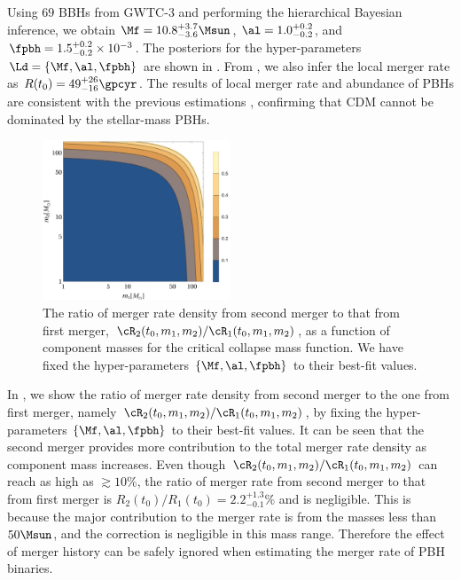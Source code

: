 \documentclass[
reprint,           %
superscriptaddress,%
amsmath,           %
amssymb,           %
aps,               %
prd,               %
notitlepage,       %
longbibliography,  %
floatfix,          %
nofootinbib,
]{revtex4-1}
\begin{document}
Using $69$ BBHs from GWTC-3 and performing the hierarchical Bayesian inference, we obtain $\Mf = 10.8^{+3.7}_{-3.6} \Msun$, $\al = 1.0^{+0.2}_{-0.2}$, and $\fpbh = 1.5^{+0.2}_{-0.2} \times 10^{-3}$. The posteriors for the hyper-parameters $\Ld = \{\Mf, \al, \fpbh\}$ are shown in . From , we also infer the local merger rate as $R(t_0) = 49^{+26}_{-16} \gpcyr$. The results of local merger rate and abundance of PBHs are consistent with the previous estimations \cite{Sasaki:2016jop,Ali-Haimoud:2017rtz,Chen:2018czv,Chen:2018rzo,Chen:2019irf,Wu:2020drm,Chen:2021nxo,Chen:2022fda}, confirming that CDM cannot be dominated by the stellar-mass PBHs. 


\begin{figure}[tbp!]
	\centering
	\includegraphics[width=0.5\textwidth]{ratio-CC.pdf}
	\caption{\label{ratio-CC}The ratio of merger rate density from second merger to that from first merger, $\cR_2(t_0, m_1, m_2)/\cR_1(t_0, m_1, m_2)$, as a function of component masses for the critical collapse mass function. We have fixed the hyper-parameters $\{\Mf, \al, \fpbh\}$ to their best-fit values.}
\end{figure}

In , we show the ratio of merger rate density from second merger to the one from first merger, namely $\cR_2(t_0, m_1, m_2)/\cR_1(t_0, m_1, m_2)$, by fixing the hyper-parameters $\{\Mf, \al, \fpbh\}$ to their best-fit values. It can be seen that the second merger provides more contribution to the total merger rate density as component mass increases. Even though $\cR_2(t_0, m_1, m_2)/\cR_1(t_0, m_1, m_2)$ can reach as high as $\gtrsim 10\%$, the ratio of merger rate from second merger to that from first merger is $R_2(t_0)/R_1(t_0) = 2.2^{+1.3}_{-0.1}\%$ and is negligible. This is because the major contribution to the merger rate is from the masses less than $50\Msun$, and the correction is negligible in this mass range. Therefore the effect of merger history can be safely ignored when estimating the merger rate of PBH binaries.
\end{document}
